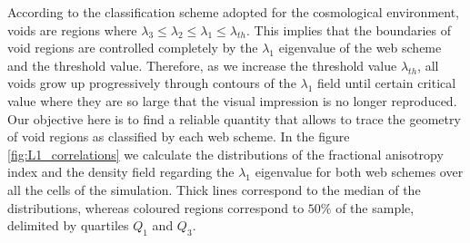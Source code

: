 \documentclass[a4,useAMS,usenatbib,usegraphicx]{latex/mn2e}
\begin{document}
According to the classification scheme adopted for the cosmological 
environment, voids are regions where 
$\lambda_3\leq\lambda_2\leq\lambda_1\leq\lambda_{th}$. This implies that
the boundaries of void regions are controlled completely by the $\lambda_1$
eigenvalue of the web scheme and the threshold value. Therefore, as we 
increase the threshold value $\lambda_{th}$, all voids grow up 
progressively through contours of the $\lambda_1$ field until certain 
critical value where they are so large that the visual impression is no 
longer reproduced. Our objective here is to find a reliable quantity that 
allows to trace the geometry of void regions as classified by each web 
scheme. In the figure \ref{fig:L1_correlations} we calculate the 
distributions of the fractional anisotropy index and the density field 
regarding the $\lambda_1$ eigenvalue for both web schemes over all the 
cells of the simulation. Thick lines correspond to the median of the 
distributions, whereas coloured regions correspond to $50\%$ of the
sample, delimited by quartiles $Q_1$ and $Q_3$. 
\end{document}
